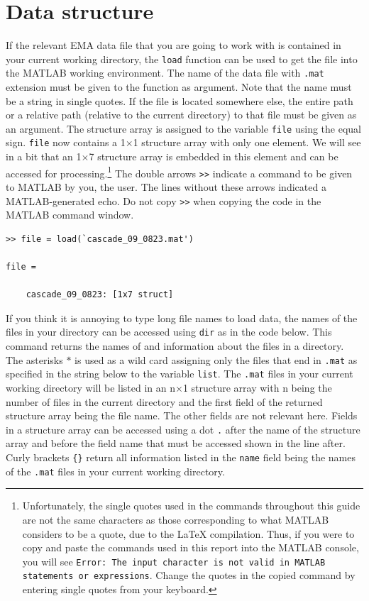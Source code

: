 \documentclass[a4paper, 12pt]{article}
\begin{document}
\newpage
\section{Data structure}\label{sec:emastruc}

If the relevant EMA data file that you are going to work with is contained in your current working directory, the \texttt{load} function can be used to get the file into the MATLAB working environment. The name of the data file with \texttt{.mat} extension must be given to the function as argument. Note that the name must be a string in single quotes. If the file is located somewhere else, the entire path or a relative path (relative to the current directory) to that file must be given as an argument. The structure array is assigned to the variable \texttt{file} using the equal sign. \texttt{file} now contains a 1$\times$1 structure array with only one element. We will see in a bit that an 1$\times$7 structure array is embedded in this element and can be accessed for processing.\footnote{Unfortunately, the single quotes used in the commands throughout this guide are not the same characters as those corresponding to what MATLAB considers to be a quote, due to the \LaTeX{} compilation. Thus, if you were to copy and paste the commands used in this report into the MATLAB console, you will see \texttt{Error: The input character is not valid in MATLAB statements or expressions}. Change the quotes in the copied command by entering single quotes from your keyboard.} The double arrows \texttt{>>} indicate a command to be given to MATLAB by you, the user. The lines without these arrows indicated a MATLAB-generated echo. Do not copy \texttt{>>} when copying the code in the MATLAB command window.

\begin{verbatim}
>> file = load(`cascade_09_0823.mat')

file = 

    cascade_09_0823: [1x7 struct]
\end{verbatim}

If you think it is annoying to type long file names to load data, the names of the files in your directory can be accessed using \texttt{dir} as in the code below. This command returns the names of and information about the files in a directory. The asterisks $\ast$ is used as a wild card assigning only the files that end in \texttt{.mat} as specified in the string below to the variable \texttt{list}. The \texttt{.mat} files in your current working directory will be listed in an n$\times$1 structure array with n being the number of files in the current directory and the first field of the returned structure array being the file name. The other fields are not relevant here. Fields in a structure array can be accessed using a dot \texttt{.} after the name of the structure array and before the field name that must be accessed shown in the line after. Curly brackets \texttt{\{\}} return all information listed in the \texttt{name} field being the names of the \texttt{.mat} files in your current working directory.
\end{document}
